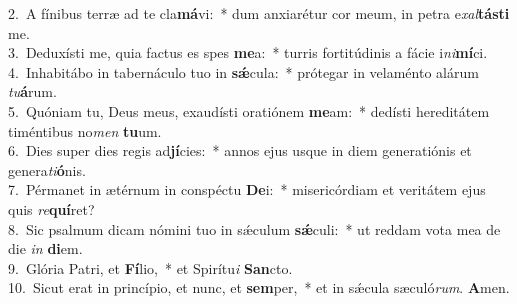 {2.~}A fínibus terræ ad te cla\textbf{má}vi:~* dum anxiarétur cor meum, in petra e\textit{xal}\textbf{tá}\textbf{sti} me.\\
{3.~}Deduxísti me, quia factus es spes \textbf{me}a:~* turris fortitúdinis a fácie i\textit{ni}\textbf{mí}ci.\\
{4.~}Inhabitábo in tabernáculo tuo in \textbf{sǽ}cula:~* prótegar in velaménto alárum \textit{tu}\textbf{á}rum.\\
{5.~}Quóniam tu, Deus meus, exaudísti oratiónem \textbf{me}am:~* dedísti hereditátem timéntibus no\textit{men} \textbf{tu}um.\\
{6.~}Dies super dies regis ad\textbf{jí}cies:~* annos ejus usque in diem generatiónis et genera\textit{ti}\textbf{ó}nis.\\
{7.~}Pérmanet in ætérnum in conspéctu \textbf{De}i:~* misericórdiam et veritátem ejus quis \textit{re}\textbf{quí}ret?\\
{8.~}Sic psalmum dicam nómini tuo in sǽculum \textbf{sǽ}culi:~* ut reddam vota mea de die \textit{in} \textbf{di}em.\\
{9.~}Glória Patri, et \textbf{Fí}lio,~* et Spirítu\textit{i} \textbf{San}cto.\\
{10.~}Sicut erat in princípio, et nunc, et \textbf{sem}per,~* et in sǽcula sæculó\textit{rum}. \textbf{A}men.\\
